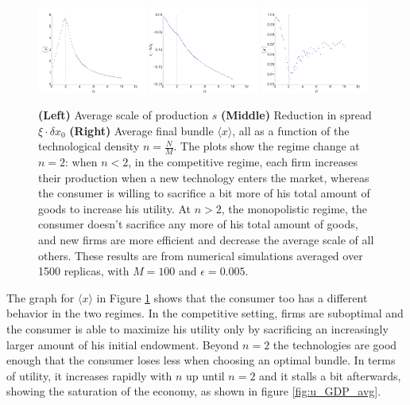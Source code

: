 \begin{figure}[!ht]
  \centering
  \includegraphics[width=0.32\textwidth]{figs_rle/s_avg.png}
  \includegraphics[width=0.32\textwidth]{figs_rle/spread_reduction.png}
  \includegraphics[width=0.32\textwidth]{figs_rle/x_avg.png}
  \caption{\textbf{(Left)} Average scale of production $s$ \textbf{(Middle)} Reduction in spread $\xi \cdot \delta x_0$ \textbf{(Right)} Average final bundle $\langle x \rangle$, all as a function of the technological density $n = \frac{N}{M}$. The plots show the regime change at $n=2$: when $n < 2$, in the competitive regime, each firm increases their production when a new technology enters the market, whereas the consumer is willing to sacrifice a bit more of his total amount of goods to increase his utility. At $n>2$, the monopolistic regime, the consumer doesn't sacrifice any more of his total amount of goods, and new firms are more efficient and decrease the average scale of all others. These results are from numerical simulations averaged over 1500 replicas, with $M=100$ and $\epsilon = 0.005$.}
  \label{fig:s_x_avg}
\end{figure}


The graph for $\langle x \rangle$ in Figure \ref{fig:s_x_avg} shows that the consumer too has a different behavior in the two regimes. In the competitive setting, firms are suboptimal and the consumer is able to maximize his utility only by sacrificing an increasingly larger amount of his initial endowment. Beyond $n=2$ the technologies are good enough that the consumer loses less when choosing an optimal bundle. In terms of utility, it increases rapidly with $n$ up until $n=2$ and it stalls a bit afterwards, showing the saturation of the economy, as shown in figure \ref{fig:u_GDP_avg}.

